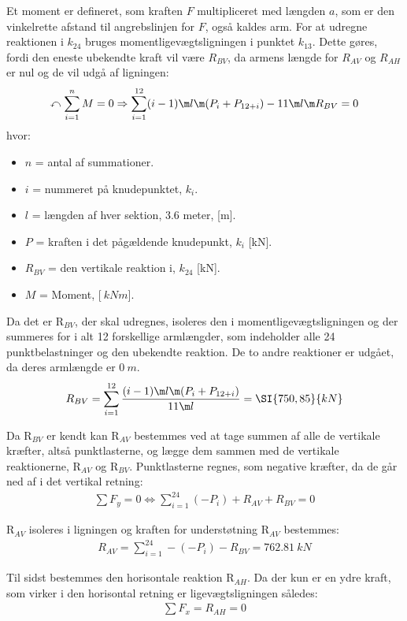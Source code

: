 Et moment er defineret, som kraften $F$ multipliceret med længden $a$, som er den vinkelrette afstand til angrebslinjen for $F$, også kaldes arm. For at udregne reaktionen i $k_{24}$ bruges momentligevægtsligningen i punktet $k_{13}$. Dette gøres, fordi den eneste ubekendte kraft vil være $R_{BV}$, da armens længde for $R_{AV}$ og $R_{AH}$ er nul og de vil udgå af ligningen:
\begin{align*}
\curvearrowleft\sum_{i=1}^{n} M = 0 \Rightarrow \sum_{i=1}^{12} (i-1) \m l \m (P_i + P_{12+i}) - 11 \m l \m R_{BV} = 0
\end{align*}
hvor:
\begin{itemize}
\item $n$ = antal af summationer.
\item $i$ = nummeret på knudepunktet, $k_{i}$.
\item $l$ = længden af hver sektion, 3.6 meter, [m].
\item $P$ = kraften i det pågældende knudepunkt, $k_{i}$ [kN].
\item $R_{BV}$ = den vertikale reaktion i, $k_{24}$ [kN].
\item $M$ = Moment, [$\SI{}{kNm}$].
\end{itemize}
Da det er R$_{BV}$, der skal udregnes, isoleres den i momentligevægtsligningen og der summeres for i alt 12 forskellige armlængder, som indeholder alle 24 punktbelastninger og den ubekendte reaktion. De to andre reaktioner er udgået, da deres armlængde er $\SI{0}{m}$.
\begin{align*}
R_{BV} = \sum_{i=1}^{12} \dfrac{(i-1) \m l \m (P_i + P_{12+i})}{11 \m l } =  \SI{750,85}{kN}
\end{align*}

Da R$_{BV}$ er kendt kan R$_{AV}$ bestemmes ved at tage summen af alle de vertikale kræfter, altså punktlasterne, og lægge dem sammen med de vertikale reaktionerne, R$_{AV}$ og R$_{BV}$. Punktlasterne regnes, som negative kræfter, da de går ned af i det vertikal retning:
\begin{align*}
\sum F_{y} = 0 \Longleftrightarrow \sum_{i=1}^{24} (-P_i) + R_{AV} + R_{BV} =  0
\end{align*}

R$_{AV}$ isoleres i ligningen og kraften for understøtning R$_{AV}$ bestemmes:
\begin{align*}
R_{AV} = \sum_{i=1}^{24} -(-P_i) - R_{BV} = \SI{762,81}{kN}
\end{align*}

Til sidst bestemmes den horisontale reaktion R$_{AH}$. Da der kun er en ydre kraft, som virker i den horisontal retning er ligevægtsligningen således:
\begin{align*}
\sum F_{x} =  R_{AH} =  0
\end{align*}
